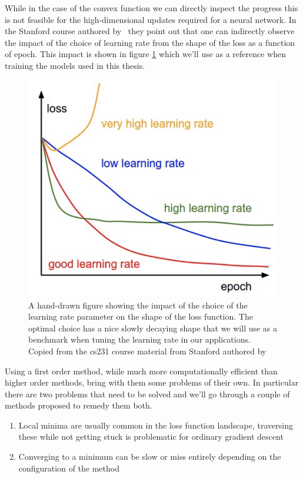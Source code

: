 \noindent While in the case of the convex function we can directly inspect the progress this is not feasible for the high-dimensional updates required for a neural network. In the Stanford course authored by \citet{Karpathy} they point out that one can indirectly observe the impact of the choice of learning rate from the shape of the loss as a function of epoch. This impact is shown in figure \ref{fig:lrloss} which we'll use as a reference when training the models used in this thesis. 

\begin{figure}[h]
\centering
\includegraphics{../figures/lr_loss.png}
\caption[The impact of $\eta$ on performance]{A hand-drawn figure showing the impact of the choice of the learning rate parameter on the shape of the loss function. The optimal choice has a nice slowly decaying shape that we will use as a benchmark when tuning the learning rate in our applications. Copied from the cs231 course material from Stanford authored by \citet{Karpathy}}\label{fig:lrloss}

\end{figure} 

\noindent Using a first order method, while much more computationally efficient than higher order methods, bring with them some problems of their own. In particular there are two problems that need to be solved and we'll go through a couple of methods proposed to remedy them both. 


\begin{enumerate}[start=0, label={(\bfseries C\arabic*):}]
\item Local minima are usually common in the loss function landscape, traversing these while not getting stuck is problematic for ordinary gradient descent
\item Converging to a minimum  can be slow or miss entirely depending on the configuration of the method 
\end{enumerate}


